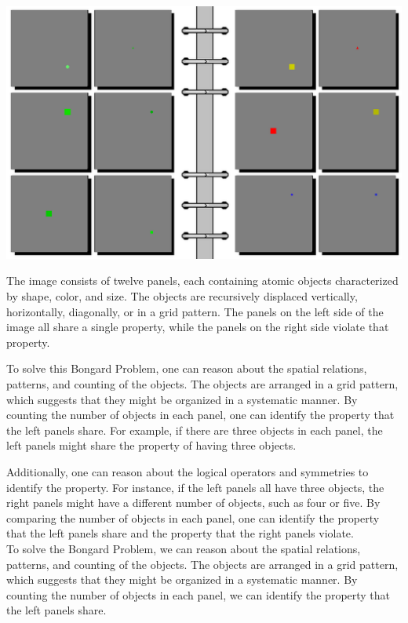 \begin{tcolorbox}[breakable,enhanced jigsaw,opacityback=0,]
	\centering
	\includegraphics[width=.8\linewidth]{imgs/bongard/easy-4.png}\\
	\begin{dialogue}
		 The image consists of twelve panels, each containing atomic objects characterized by shape, color, and size. The objects are recursively displaced vertically, horizontally, diagonally, or in a grid pattern. The panels on the left side of the image all share a single property, while the panels on the right side violate that property.
		
		To solve this Bongard Problem, one can reason about the spatial relations, patterns, and counting of the objects. The objects are arranged in a grid pattern, which suggests that they might be organized in a systematic manner. By counting the number of objects in each panel, one can identify the property that the left panels share. For example, if there are three objects in each panel, the left panels might share the property of having three objects.
		
		Additionally, one can reason about the logical operators and symmetries to identify the property. For instance, if the left panels all have three objects, the right panels might have a different number of objects, such as four or five. By comparing the number of objects in each panel, one can identify the property that the left panels share and the property that the right panels violate.
		\\
		 To solve the Bongard Problem, we can reason about the spatial relations, patterns, and counting of the objects. The objects are arranged in a grid pattern, which suggests that they might be organized in a systematic manner. By counting the number of objects in each panel, we can identify the property that the left panels share.
		

\end{dialogue}
\end{tcolorbox}
